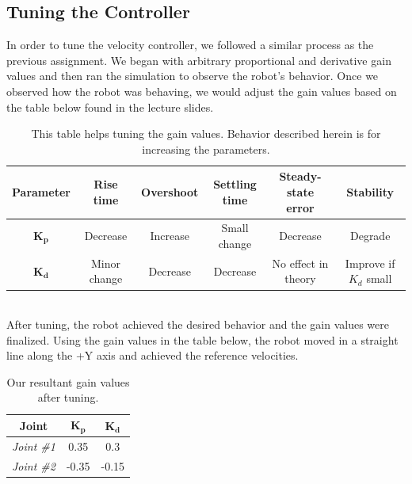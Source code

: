 \documentclass{article}
\begin{document}
\subsection{Tuning the Controller}
\vspace{0.15in}
In order to tune the velocity controller, we followed a similar process as the 
previous assignment. We began with arbitrary proportional and derivative gain values 
and then ran the simulation to observe the robot's behavior. Once we observed 
how the robot was behaving, we would adjust the gain values based on the table 
below found in the lecture slides.
\begin{table}[h!]
    \begin{center}
        \begin{tabular}{|c|c|c|c|c|c|}
        \hline
        \textbf{Parameter} & \textbf{Rise time} & \textbf{Overshoot} & \textbf{Settling time} & \textbf{Steady-state error} & \textbf{Stability} \\
        \hline
        $\mathbf{K_p}$ & Decrease & Increase & Small change & Decrease & Degrade\\
        \hline
        $\mathbf{K_d}$ & Minor change & Decrease & Decrease & No effect in theory & Improve if $K_d$ small \\
        \hline
        \end{tabular}
        \caption{This table helps tuning the gain values. Behavior described herein is for increasing the parameters.}
    \end{center}
\end{table}\\
After tuning, the robot achieved the desired behavior and the gain values were finalized. Using the gain values in the table below, 
the robot moved in a straight line along the +Y axis and achieved the
 reference velocities.
\begin{table}[h!]
    \begin{center}
        \begin{tabular}{|c|c|c|}
            \hline
            \textbf{Joint} & $\mathbf{K_p}$ & $\mathbf{K_d}$\\
            \hline
            \textit{Joint \#1} & 0.35 & 0.3\\
            \hline
            \textit{Joint \#2} & -0.35 & -0.15\\
            \hline
        \end{tabular}
        \caption{Our resultant gain values after tuning.}
    \end{center}
\end{table}
\vspace{-0.15in}
\end{document}
